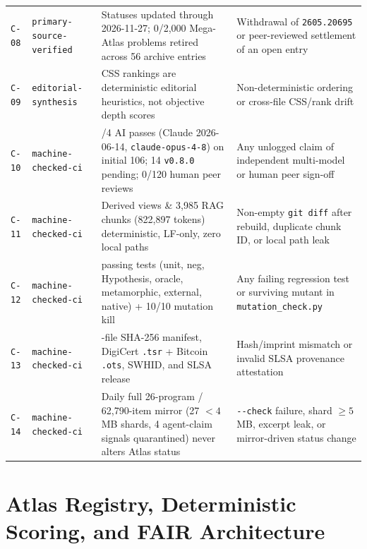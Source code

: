 \documentclass[11pt,reqno]{amsart}
\theoremstyle{plain}
\theoremstyle{definition}
\newcommand{\code}[1]{{\upshape\nolinkurl{#1}}}
\begin{document}
\begin{table}[htbp]
\begin{tabularx}{\textwidth}{@{}l>{\raggedright\arraybackslash}p{3.4cm}>{\raggedright\arraybackslash}X>{\raggedright\arraybackslash}X@{}}
\code{C-08} & \code{primary-source-verified} & Statuses updated through 2026-11-27; 0/2,000 Mega-Atlas problems retired across 56 archive entries & Withdrawal of \code{2605.20695} or peer-reviewed settlement of an open entry \\
\code{C-09} & \code{editorial-synthesis} & CSS rankings are deterministic editorial heuristics, not objective depth scores & Non-deterministic ordering or cross-file CSS/rank drift \\
\code{C-10} & \code{machine-checked-ci} & 1/4 AI passes (Claude 2026-06-14, \code{claude-opus-4-8}) on initial 106; 14 \texttt{v0.8.0} pending; 0/120 human peer reviews & Any unlogged claim of independent multi-model or human peer sign-off \\
\code{C-11} & \code{machine-checked-ci} & Derived views \& 3,985 RAG chunks (822,897 tokens) deterministic, LF-only, zero local paths & Non-empty \code{git diff} after rebuild, duplicate chunk ID, or local path leak \\
\code{C-12} & \code{machine-checked-ci} & 104 passing tests (unit, neg, Hypothesis, oracle, metamorphic, external, native) + 10/10 mutation kill & Any failing regression test or surviving mutant in \code{mutation_check.py} \\
\code{C-13} & \code{machine-checked-ci} & 52-file SHA-256 manifest, DigiCert \code{.tsr} + Bitcoin \code{.ots}, SWHID, and SLSA release & Hash/imprint mismatch or invalid SLSA provenance attestation \\
\code{C-14} & \code{machine-checked-ci} & Daily full 26-program / 62,790-item mirror (27 $<4$\,MB shards, 4 agent-claim signals quarantined) never alters Atlas status & \code{--check} failure, shard $\ge 5$\,MB, excerpt leak, or mirror-driven status change \\
\bottomrule
\end{tabularx}
\end{table}

\section{Atlas Registry, Deterministic Scoring, and FAIR Architecture}\label{sec:atlas}
\end{document}
